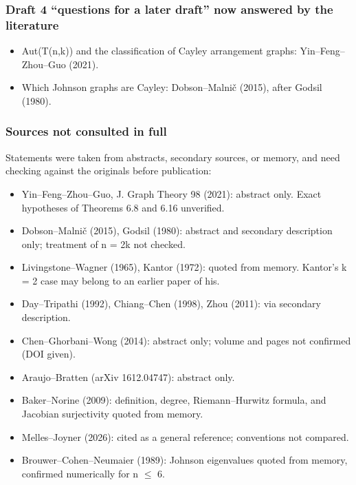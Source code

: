 \documentclass[12pt,letterpaper]{article}
\providecommand{\tightlist}{\setlength{\itemsep}{0pt}\setlength{\parskip}{0pt}}
\begin{document}
\hypertarget{draft-4-questions-for-a-later-draft-now-answered-by-the-literature}{%
\subsubsection*{Draft 4 ``questions for a later draft'' now answered by
the
literature}\label{draft-4-questions-for-a-later-draft-now-answered-by-the-literature}}

\begin{itemize}
\tightlist
\item
  Aut(T(n,k)) and the classification of Cayley arrangement graphs:
  Yin--Feng--Zhou--Guo (2021).
\item
  Which Johnson graphs are Cayley: Dobson--Malnič (2015), after Godsil
  (1980).
\end{itemize}

\hypertarget{sources-not-consulted-in-full}{%
\subsubsection*{Sources not consulted in
full}\label{sources-not-consulted-in-full}}

Statements were taken from abstracts, secondary sources, or memory, and
need checking against the originals before publication:

\begin{itemize}
\tightlist
\item
  Yin--Feng--Zhou--Guo, J. Graph Theory 98 (2021): abstract only. Exact
  hypotheses of Theorems 6.8 and 6.16 unverified.
\item
  Dobson--Malnič (2015), Godsil (1980): abstract and secondary
  description only; treatment of n = 2k not checked.
\item
  Livingstone--Wagner (1965), Kantor (1972): quoted from memory.
  Kantor's k = 2 case may belong to an earlier paper of his.
\item
  Day--Tripathi (1992), Chiang--Chen (1998), Zhou (2011): via secondary
  description.
\item
  Chen--Ghorbani--Wong (2014): abstract only; volume and pages not
  confirmed (DOI given).
\item
  Araujo--Bratten (arXiv 1612.04747): abstract only.
\item
  Baker--Norine (2009): definition, degree, Riemann--Hurwitz formula,
  and Jacobian surjectivity quoted from memory.
\item
  Melles--Joyner (2026): cited as a general reference; conventions not
  compared.
\item
  Brouwer--Cohen--Neumaier (1989): Johnson eigenvalues quoted from
  memory, confirmed numerically for n $\leq$ 6.
\end{itemize}
\end{document}
